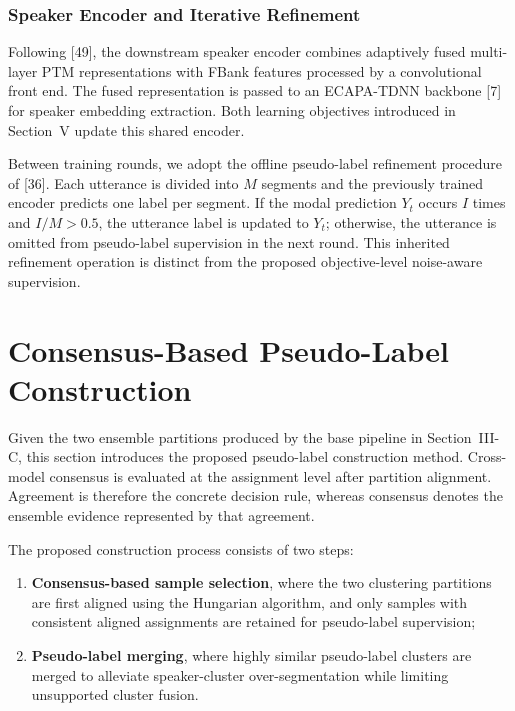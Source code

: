 \documentclass[journal]{IEEEtran}
\begin{document}
\subsubsection{Speaker Encoder and Iterative Refinement}

Following [49], the downstream speaker encoder combines adaptively fused
multi-layer PTM representations with FBank features processed by a
convolutional front end. The fused representation is passed to an
ECAPA-TDNN backbone [7] for speaker embedding extraction. Both learning
objectives introduced in Section~V update this shared encoder.

Between training rounds, we adopt the offline pseudo-label refinement
procedure of [36]. Each utterance is divided into $M$ segments and the
previously trained encoder predicts one label per segment. If the modal
prediction $Y_t$ occurs $I$ times and $I/M>0.5$, the utterance label is
updated to $Y_t$; otherwise, the utterance is omitted from pseudo-label
supervision in the next round. This inherited refinement operation is
distinct from the proposed objective-level noise-aware supervision.

\section{Consensus-Based Pseudo-Label Construction}

Given the two ensemble partitions produced by the base pipeline in
Section~III-C, this section introduces the proposed pseudo-label
construction method. Cross-model consensus is evaluated at the assignment
level after partition alignment. Agreement is therefore the concrete
decision rule, whereas consensus denotes the ensemble evidence represented
by that agreement.

The proposed construction process consists of two steps:

\begin{enumerate}
    \item \textbf{Consensus-based sample selection}, where the two clustering partitions are first aligned using the Hungarian algorithm, and only samples with consistent aligned assignments are retained for pseudo-label supervision;

    \item \textbf{Pseudo-label merging}, where highly similar pseudo-label clusters are merged to alleviate speaker-cluster over-segmentation while limiting unsupported cluster fusion.
\end{enumerate}
\end{document}
